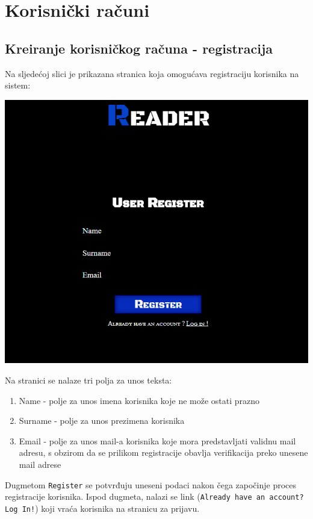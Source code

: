 \chapter{Korisnički računi}

\section{Kreiranje korisničkog računa - registracija}

Na sljedećoj slici je prikazana stranica koja omogućava registraciju korisnika na sistem:

\begin{center}
    \includegraphics[scale=0.6]{images/Registracija.png}
\end{center}

Na stranici se nalaze tri polja za unos teksta:
\begin{enumerate}
    \item Name - polje za unos imena korisnika koje ne može ostati prazno
    \item Surname - polje za unos prezimena korisnika
    \item Email - polje za unos mail-a korisnika koje mora predstavljati validnu mail adresu, s obzirom da se prilikom registracije obavlja verifikacija preko unesene mail adrese
\end{enumerate}

Dugmetom \texttt{Register} se potvrđuju uneseni podaci nakon čega započinje proces registracije korisnika. Ispod dugmeta, nalazi se link (\texttt{Already have an account? Log In!}) koji vraća korisnika na stranicu za prijavu.

